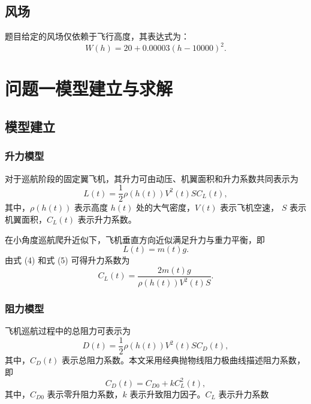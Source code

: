 \documentclass[UTF8]{ctexart}
\begin{document}
\subsection{风场}
题目给定的风场仅依赖于飞行高度，其表达式为：
\begin{equation}
    W(h)=20+0.00003(h-10000)^2.
    \label{eq:wind_model}
\end{equation}

\section{问题一模型建立与求解}
\subsection{模型建立}
\subsubsection{升力模型}

对于巡航阶段的固定翼飞机，其升力可由动压、机翼面积和升力系数共同表示为\cite{5}
\begin{equation}
    L(t)=\frac{1}{2}\rho(h(t))V^2(t)S C_L(t),
    \label{eq:lift}
\end{equation}
其中，$\rho(h(t))$ 表示高度 $h(t)$ 处的大气密度，$V(t)$ 表示飞机空速，
$S$ 表示机翼面积，$C_L(t)$ 表示升力系数。

在小角度巡航爬升近似下，飞机垂直方向近似满足升力与重力平衡，即
\begin{equation}
    L(t)=m(t)g.
    \label{eq:lift_balance}
\end{equation}
由式 (4) 和式 (5) 可得升力系数为
\begin{equation}
    C_L(t)=\frac{2m(t)g}{\rho(h(t))V^2(t)S}.
    \label{eq:CL}
\end{equation}
\subsubsection{阻力模型}

飞机巡航过程中的总阻力可表示为\cite{6}
\begin{equation}
    D(t)=\frac{1}{2}\rho(h(t))V^2(t)S C_D(t),
    \label{eq:drag}
\end{equation}
其中，$C_D(t)$ 表示总阻力系数。本文采用经典抛物线阻力极曲线描述阻力系数\cite{3}，
即
\begin{equation}
    C_D(t)=C_{D0}+kC_L^2(t),
    \label{eq:CD}
\end{equation}
其中，$C_{D0}$ 表示零升阻力系数，$k$ 表示升致阻力因子。$C_{L}$ 表示升力系数
\end{document}
